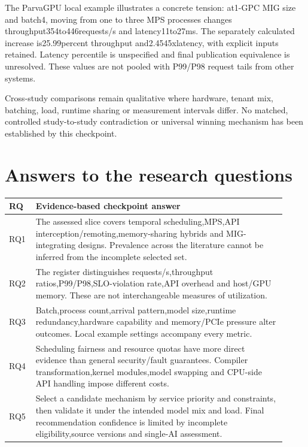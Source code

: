 \documentclass[12pt,a4paper]{article}
\begin{document}
The ParvaGPU local example illustrates a concrete tension:\allowbreak{} at1-GPC MIG size and batch4, moving from one to three MPS processes changes throughput354to446requests/\allowbreak{}s and latency11to27ms. The separately calculated increase is25.99percent throughput and2.4545xlatency, with explicit inputs retained. Latency percentile is unspecified and final publication equivalence is unresolved. These values are not pooled with P99/\allowbreak{}P98 request tails from other systems.


Cross-study comparisons remain qualitative where hardware, tenant mix, batching, load, runtime sharing or measurement intervals differ. No matched, controlled study-to-study contradiction or universal winning mechanism has been established by this checkpoint.



\section{Answers to the research questions}


{\small\begin{longtable}{>{\raggedright\arraybackslash}p{0.08\linewidth}>{\raggedright\arraybackslash}p{0.84\linewidth}}
\toprule
RQ & Evidence-based checkpoint answer\\\midrule
\endhead
RQ1 & The assessed slice covers temporal scheduling,MPS,API interception/\allowbreak{}remoting,memory-sharing hybrids and MIG-integrating designs. Prevalence across the literature cannot be inferred from the incomplete selected set.\\
RQ2 & The register distinguishes requests/\allowbreak{}s,throughput ratios,P99/\allowbreak{}P98,SLO-violation rate,API overhead and host/\allowbreak{}GPU memory. These are not interchangeable measures of utilization.\\
RQ3 & Batch,process count,arrival pattern,model size,runtime redundancy,hardware capability and memory/\allowbreak{}PCIe pressure alter outcomes. Local example settings accompany every metric.\\
RQ4 & Scheduling fairness and resource quotas have more direct evidence than general security/\allowbreak{}fault guarantees. Compiler transformation,kernel modules,model swapping and CPU-side API handling impose different costs.\\
RQ5 & Select a candidate mechanism by service priority and constraints, then validate it under the intended model mix and load. Final recommendation confidence is limited by incomplete eligibility,source versions and single-AI assessment.\\
\bottomrule
\end{longtable}}
\end{document}
